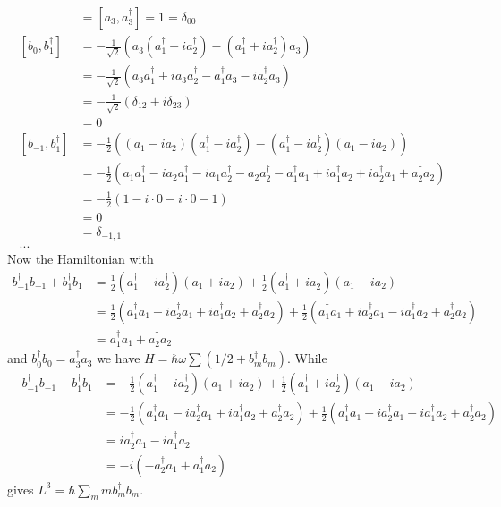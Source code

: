 \documentclass[10pt,a4paper]{book}
\theoremstyle{definition}
\begin{document}
\begin{align}
[b_0,b_0^\dagger]&=[a_3,a_3^\dagger]=1=\delta_{00}\\
[b_0,b_1^\dagger]
&=-\frac{1}{\sqrt{2}}(a_3(a_1^\dagger+ia_2^\dagger)-(a_1^\dagger+ia_2^\dagger)a_3 )\\
&=-\frac{1}{\sqrt{2}}(a_3a_1^\dagger+ia_3a_2^\dagger-a_1^\dagger a_3-ia_2^\dagger a_3 )\\
&=-\frac{1}{\sqrt{2}}(\delta_{12}+i\delta_{23} )\\
&=0\\
[b_{-1},b_1^\dagger]&=-\frac{1}{2}((a_1-ia_2)(a_1^\dagger-ia_2^\dagger) - (a_1^\dagger-ia_2^\dagger)(a_1-ia_2) )\\
&=-\frac{1}{2}(a_1a_1^\dagger-ia_2a_1^\dagger-ia_1a_2^\dagger-a_2a_2^\dagger-a_1^\dagger a_1+ia_1^\dagger a_2+ia_2^\dagger a_1+a_2^\dagger a_2)\\
&=-\frac{1}{2}(1-i\cdot 0-i\cdot 0-1)\\
&=0\\
&=\delta_{-1,1}\\
...
\end{align}
Now the Hamiltonian with
\begin{align}
b_{-1}^\dagger b_{-1}+b_{1}^\dagger b_{1}
&=\frac{1}{2}(a_1^\dagger-ia_2^\dagger)(a_1+ia_2)+\frac{1}{2}(a_1^\dagger+ia_2^\dagger)(a_1-ia_2)\\
&=\frac{1}{2}(a_1^\dagger a_1-ia_2^\dagger a_1+ia_1^\dagger a_2+a_2^\dagger a_2)+\frac{1}{2}(a_1^\dagger a_1+ia_2^\dagger a_1-ia_1^\dagger a_2+a_2^\dagger a_2)\\
&=a_1^\dagger a_1+a_2^\dagger a_2
\end{align}
and $b_0^\dagger b_0=a_3^\dagger a_3$ we have $H=\hbar\omega\sum(1/2+b_m^\dagger b_m)$. While
\begin{align}
-b_{-1}^\dagger b_{-1}+b_{1}^\dagger b_{1}
&=-\frac{1}{2}(a_1^\dagger-ia_2^\dagger)(a_1+ia_2)+\frac{1}{2}(a_1^\dagger+ia_2^\dagger)(a_1-ia_2)\\
&=-\frac{1}{2}(a_1^\dagger a_1-ia_2^\dagger a_1+ia_1^\dagger a_2+a_2^\dagger a_2)+\frac{1}{2}(a_1^\dagger a_1+ia_2^\dagger a_1-ia_1^\dagger a_2+a_2^\dagger a_2)\\
&=ia_2^\dagger a_1-ia_1^\dagger a_2\\
&=-i(-a_2^\dagger a_1+a_1^\dagger a_2)
\end{align}
gives $L^3=\hbar\sum_m mb_m^\dagger b_m$.
\end{document}
